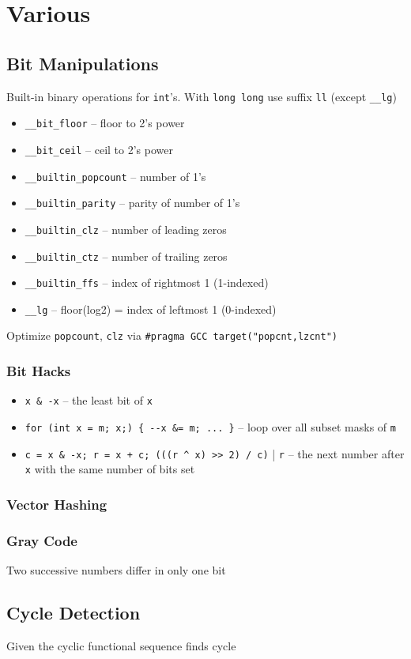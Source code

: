 \section{Various}

\subsection{Bit Manipulations}

Built-in binary operations for \verb|int|'s. With \verb|long long| use suffix \verb|ll| (except \verb|__lg|)

\begin{itemize}
  \item \verb|__bit_floor| -- floor to 2's power
  \item \verb|__bit_ceil| -- ceil to 2's power
  \item \verb|__builtin_popcount| -- number of 1's
  \item \verb|__builtin_parity| -- parity of number of 1's
  \item \verb|__builtin_clz| -- number of leading zeros
  \item \verb|__builtin_ctz| -- number of trailing zeros
  \item \verb|__builtin_ffs| -- index of rightmost 1 (1-indexed)
  \item \verb|__lg| -- floor(log2) = index of leftmost 1 (0-indexed)
\end{itemize}

Optimize \verb|popcount|, \verb|clz| via \verb|#pragma GCC target("popcnt,lzcnt")|

\subsubsection{Bit Hacks}

\vspace{1em}
\begin{itemize}
  \item \verb|x & -x| -- the least bit of \verb|x|
  \item \verb|for (int x = m; x;) { --x &= m; ... }| -- loop over all subset masks of \verb|m|
  \item \verb|c = x & -x; r = x + c; (((r ^ x) >> 2) / c)| | \verb|r| -- the next number after \verb|x| with the same number of bits set
\end{itemize}

\subsubsection{Vector Hashing}

\subsubsection{Gray Code}
Two successive numbers differ in only one bit

\subsection{Cycle Detection}
Given the cyclic functional sequence finds cycle
